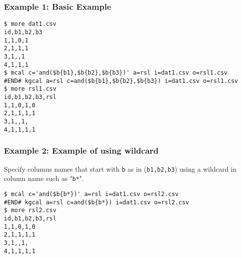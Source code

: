 \subsubsection*{Example 1: Basic Example}



\begin{Verbatim}[baselinestretch=0.7,frame=single]
$ more dat1.csv
id,b1,b2,b3
1,1,0,1
2,1,1,1
3,1,,1
4,1,1,1
$ mcal c='and($b{b1},$b{b2},$b{b3})' a=rsl i=dat1.csv o=rsl1.csv
#END# kgcal a=rsl c=and($b{b1},$b{b2},$b{b3}) i=dat1.csv o=rsl1.csv
$ more rsl1.csv
id,b1,b2,b3,rsl
1,1,0,1,0
2,1,1,1,1
3,1,,1,
4,1,1,1,1
\end{Verbatim}
\subsubsection*{Example 2: Example of using wildcard}

Specify columns names that start with \verb|b| as in (\verb|b1,b2,b3|) using a wildcard in column name such as "\verb|b*|".


\begin{Verbatim}[baselinestretch=0.7,frame=single]
$ mcal c='and($b{b*})' a=rsl i=dat1.csv o=rsl2.csv
#END# kgcal a=rsl c=and($b{b*}) i=dat1.csv o=rsl2.csv
$ more rsl2.csv
id,b1,b2,b3,rsl
1,1,0,1,0
2,1,1,1,1
3,1,,1,
4,1,1,1,1
\end{Verbatim}
